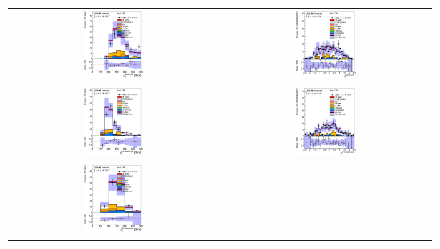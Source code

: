 \clearpage
\begin{figure}[htbp]
\begin{center}
\begin{tabular}{cc}
%
\includegraphics[width=0.30\textwidth]{appendices/figures/sdrs/JetPt1_ELEMUONCR3_1W_NOMINAL.eps} &
\includegraphics[width=0.30\textwidth]{appendices/figures/sdrs/JetEta1_ELEMUONCR3_1W_NOMINAL.eps} \\
\includegraphics[width=0.30\textwidth]{appendices/figures/sdrs/JetPt2_ELEMUONCR3_1W_NOMINAL.eps} &
\includegraphics[width=0.30\textwidth]{appendices/figures/sdrs/JetEta2_ELEMUONCR3_1W_NOMINAL.eps} \\
\includegraphics[width=0.30\textwidth]{appendices/figures/sdrs/JetPt3_ELEMUONCR3_1W_NOMINAL.eps} &

\end{tabular}
\end{center}
\end{figure}
